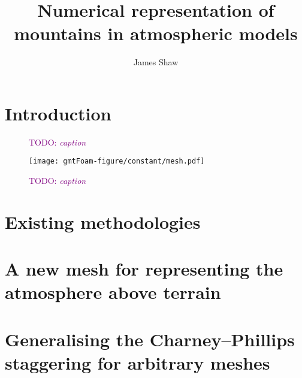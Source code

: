 \documentclass[a4paper,oneside]{memoir}
\title{Numerical representation of mountains in atmospheric models}
\author{James Shaw}
\date{\TODO{date}}
\newcommand{\TODO}[1]{\textcolor{purple}{TODO: \emph{#1}}}
\begin{document}


\frontmatter
\thispagestyle{plain}
\null\vfil
\begin{abstract}
\blindtext
\end{abstract}
\vfil

\cleardoublepage
{\hypersetup{linkcolor=black}\tableofcontents*}

\mainmatter
\chapter{Introduction}

\begin{figure}
\centering

\caption{\TODO{caption}}
\end{figure}

\begin{figure}
\centering
\texttt{[image: gmtFoam-figure/constant/mesh.pdf]}
\caption{\TODO{caption}}
\end{figure}


\chapter{Existing methodologies}
\chapter{A new mesh for representing the atmosphere above terrain}

\chapter{Generalising the Charney–Phillips staggering for arbitrary meshes}
%
%

\backmatter


\end{document}
